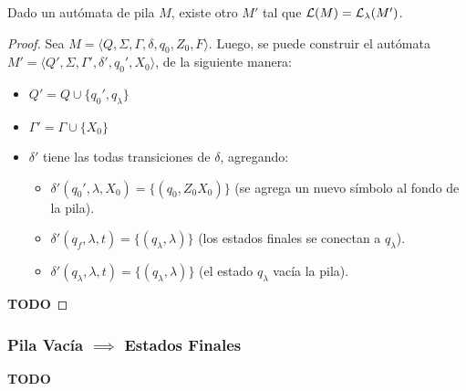 \begin{theorem*}
    Dado un autómata de pila $M$, existe otro $M'$ tal que $\mathcal{L}(M) = \mathcal{L}_\lambda(M')$.
\end{theorem*}
\begin{proof}
    Sea $M = \langle Q, \Sigma, \Gamma, \delta, q_0, Z_0, F \rangle$. Luego, se puede construir el autómata $M' = \langle Q', \Sigma, \Gamma', \delta', q_0', X_0 \rangle$, de la siguiente manera:
    \begin{itemize}
        \item $Q' = Q \cup \{q_0', q_\lambda\}$
        \item $\Gamma' = \Gamma \cup \{X_0\}$
        \item $\delta'$ tiene las todas transiciones de $\delta$, agregando:
        \begin{itemize}
            \item $\delta'(q_0', \lambda, X_0) = \{(q_0, Z_0 X_0)\}$ (se agrega un nuevo símbolo al fondo de la pila).
            \item $\delta'(q_f, \lambda, t) = \{(q_\lambda, \lambda)\}$ (los estados finales se conectan a $q_\lambda$).
            \item $\delta'(q_\lambda, \lambda, t) = \{(q_\lambda, \lambda)\}$ (el estado $q_\lambda$ vacía la pila).
        \end{itemize}
    \end{itemize}

    \textbf{TODO}
\end{proof}

\subsubsection{Pila Vacía $\implies$ Estados Finales}

\textbf{TODO}
